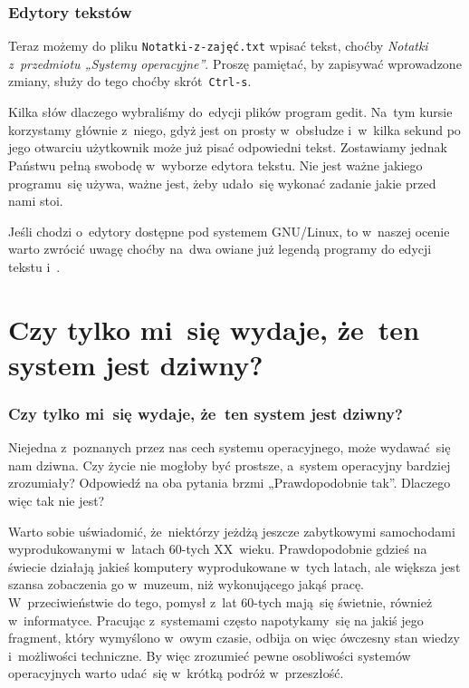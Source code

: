 \documentclass[10pt,t]{beamer}
\begin{document}
\begin{frame}
  \frametitle{Edytory tekstów}


  Teraz możemy do pliku \texttt{Notatki-z-zajęć.txt} wpisać tekst, choćby
  \textit{Notatki z~przedmiotu „Systemy operacyjne”}. Proszę pamiętać, by
  zapisywać wprowadzone zmiany, służy do tego choćby skrót~\texttt{Ctrl-s}.

  Kilka słów dlaczego wybraliśmy do~edycji plików program gedit. Na~tym
  kursie korzystamy głównie z~niego, gdyż jest on prosty w~obsłudze
  i~w~kilka sekund po jego otwarciu użytkownik może już pisać odpowiedni
  tekst. Zostawiamy jednak Państwu pełną swobodę w~wyborze edytora tekstu.
  Nie jest ważne jakiego programu~się używa, ważne jest, żeby udało~się
  wykonać zadanie jakie przed nami stoi.

  Jeśli chodzi o~edytory dostępne pod systemem GNU/Linux, to w~naszej
  ocenie warto zwrócić uwagę choćby na~dwa owiane już legendą programy
  do edycji tekstu 
  i~.

\end{frame}










\section{Czy tylko mi~się wydaje, że~ten system jest dziwny?}


\begin{frame}
  \frametitle{Czy tylko mi~się wydaje, że~ten system jest dziwny?}


  Niejedna z~poznanych przez nas cech systemu operacyjnego, może
  wydawać~się nam dziwna. Czy życie nie mogłoby być prostsze, a~system
  operacyjny bardziej zrozumiały? Odpowiedź na oba pytania brzmi
  „Prawdopodobnie tak”. Dlaczego więc tak nie jest?

  Warto sobie uświadomić, że~niektórzy jeżdżą jeszcze zabytkowymi
  samochodami wyprodukowanymi w~latach $60$-tych XX~wieku. Prawdopodobnie
  gdzieś na świecie działają jakieś komputery wyprodukowane w~tych latach,
  ale większa jest szansa zobaczenia go w~muzeum, niż wykonującego jakąś
  pracę. W~przeciwieństwie do tego, pomysł z~lat $60$-tych mają~się
  świetnie, również w~informatyce. Pracując z~systemami często
  napotykamy~się na jakiś jego fragment, który wymyślono w~owym czasie,
  odbija on więc ówczesny stan wiedzy i~możliwości techniczne. By więc
  zrozumieć pewne osobliwości systemów operacyjnych warto udać~się w~krótką
  podróż w~przeszłość.

\end{frame}
\end{document}
